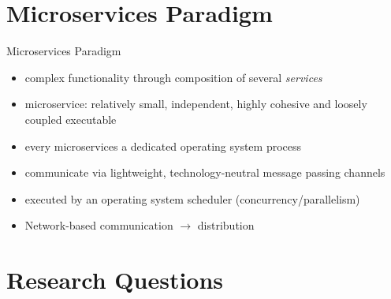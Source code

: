 \documentclass{beamer}
\begin{document}


  


\section{Microservices Paradigm}


\begin{frame}{Microservices Paradigm}

\begin{itemize}
  \item complex functionality through composition of several \textit{services}
  \item microservice: relatively small, independent, highly cohesive and loosely coupled executable
  \item every microservices a dedicated operating system process
  \item communicate via lightweight, technology-neutral message passing channels
  \item executed by an operating system scheduler (concurrency/parallelism)
  \item Network-based communication $\rightarrow$ distribution
\end{itemize}

\end{frame}


\section{Research Questions}

\end{document}
